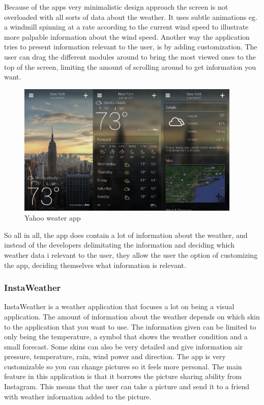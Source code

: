 Because of the apps very minimalistic design approach the screen is not overloaded with all sorts of data about the weather.
It uses subtle animations eg. a windmill spinning at a rate according to the current wind speed to illustrate more palpable information about the wind speed. 
Another way the application tries to present information relevant to the user, is by adding customization. 
The user can drag the different modules around to bring the most viewed ones to the top of the screen, limiting the amount of scrolling around to get information you want.

\begin{figure}[!htbp]
    \centering
    \includegraphics[width=0.95\textwidth]{images/Yahoo1.png}
    \caption{Yahoo weater app}
    \label{fig:yahoo1}
\end{figure}

So all in all, the app does contain a lot of information about the weather, and instead of the developers delimitating the information and deciding which weather data i relevant to the user, they allow the user the option of customizing the app, deciding themselves what information is relevant. 


\FloatBarrier
\subsubsection*{InstaWeather} %
\label{ssub:instaweather}

InstaWeather is a weather application that focuses a lot on being a visual application. 
The amount of information about the weather depends on which skin to the application that you want to use. 
The information given can be limited to only being the temperature, a symbol that shows the weather condition and a small forecast. 
Some skins can also be very detailed and give information air pressure, temperature, rain, wind power and direction. 
The app is very customizable so you can change pictures so it feels more personal. 
The main feature in this application is that it borrows the picture sharing ability from Instagram. 
This means that the user can take a picture and send it to a friend with weather information added to the picture.  

